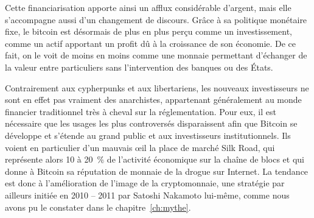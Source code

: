 Cette financiarisation apporte ainsi un afflux considérable d'argent, mais elle s'accompagne aussi d'un changement de discours. Grâce à sa politique monétaire fixe, le bitcoin est désormais de plus en plus perçu comme un investissement, comme un actif apportant un profit dû à la croissance de son économie. De ce fait, on le voit de moins en moins comme une monnaie permettant d'échanger de la valeur entre particuliers sans l'intervention des banques ou des États.

Contrairement aux cypherpunks et aux libertariens, les nouveaux investisseurs ne sont en effet pas vraiment des anarchistes, appartenant généralement au monde financier traditionnel très à cheval sur la réglementation. Pour eux, il est nécessaire que les usages les plus controversés disparaissent afin que Bitcoin se développe et s'étende au grand public et aux investisseurs institutionnels. Ils voient en particulier d'un mauvais œil la place de marché Silk Road, qui représente alors 10 à 20~\% de l'activité économique sur la chaîne de blocs et qui donne à Bitcoin sa réputation de monnaie de la drogue sur Internet. La tendance est donc à l'amélioration de l'image de la cryptomonnaie, une stratégie par ailleurs initiée en 2010 -- 2011 par Satoshi Nakamoto lui-même, comme nous avons pu le constater dans le chapitre~\ref{ch:mythe}.

